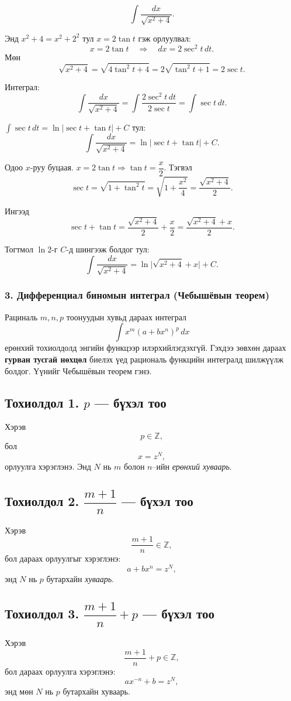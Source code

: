 \begin{example}
\[
\int \frac{dx}{\sqrt{x^2+4}}.
\]

Энд $x^2+4 = x^2+2^2$ тул $x=2\tan t$ гэж орлуулвал:
\[
x = 2\tan t \quad\Rightarrow\quad dx = 2\sec^2 t\,dt.
\]
Мөн
\[
\sqrt{x^2+4}
= \sqrt{4\tan^2 t + 4}
= 2\sqrt{\tan^2 t+1}
= 2\sec t.
\]

Интеграл:
\[
\int \frac{dx}{\sqrt{x^2+4}}
= \int \frac{2\sec^2 t\,dt}{2\sec t}
= \int \sec t\,dt.
\]

$\displaystyle \int \sec t\,dt = \ln|\sec t + \tan t| + C$ тул:
\[
\int \frac{dx}{\sqrt{x^2+4}}
= \ln|\sec t + \tan t| + C.
\]

Одоо $x$-руу буцаая. $x=2\tan t \Rightarrow \tan t = \dfrac{x}{2}$. 
Тэгвэл
\[
\sec t = \sqrt{1+\tan^2 t}
= \sqrt{1+\frac{x^2}{4}}
= \frac{\sqrt{x^2+4}}{2}.
\]

Ингээд
\[
\sec t + \tan t = \frac{\sqrt{x^2+4}}{2} + \frac{x}{2}
= \frac{\sqrt{x^2+4}+x}{2}.
\]

Тогтмол $\ln 2$-г $C$-д шингээж болдог тул:
\[
\int \frac{dx}{\sqrt{x^2+4}}
= \ln\bigl|\sqrt{x^2+4}+x\bigr| + C.
\]
\end{example}

\subsubsection*{3. Дифференциал биномын интеграл (Чебышёвын теорем)}

Рациналь $m,n,p$ тоонуудын хувьд дараах интеграл
\[
\int x^{m}(a+b x^{n})^{p}\,dx
\]
ерөнхий тохиолдолд энгийн функцээр илэрхийлэгдэхгүй. Гэхдээ зөвхөн дараах
\textbf{гурван тусгай нөхцөл} биелэх үед рациональ функцийн интегралд шилжүүлж болдог. Үүнийг Чебышёвын теорем гэнэ.

\subsection*{Тохиолдол 1. $p$ — бүхэл тоо}
Хэрэв
\[
p\in \mathbb{Z},
\]
бол 
\[
x = z^{N},
\]
орлуулга хэрэглэнэ. Энд $N$ нь $m$ болон $n$–ийн  \emph{ерөнхий хуваарь}.

\subsection*{Тохиолдол 2. $\dfrac{m+1}{n}$ — бүхэл тоо}
Хэрэв
\[
\frac{m+1}{n}\in\mathbb{Z},
\]
бол дараах орлуулгыг хэрэглэнэ:
\[
a + b x^{n} = z^{N},
\]
энд $N$ нь $p$ бутархайн \emph{хуваарь}.

\subsection*{Тохиолдол 3. $\dfrac{m+1}{n}+p$ — бүхэл тоо}
Хэрэв
\[
\frac{m+1}{n} + p \in \mathbb{Z},
\]
бол дараах орлуулга хэрэглэнэ:
\[
a x^{-n} + b = z^{N},
\]
энд мөн $N$ нь $p$ бутархайн хуваарь.

